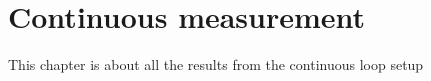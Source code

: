 \chapter{Continuous \SOtwo measurement}
\label{ch:cont}

This chapter is about all the results from the continuous loop setup
